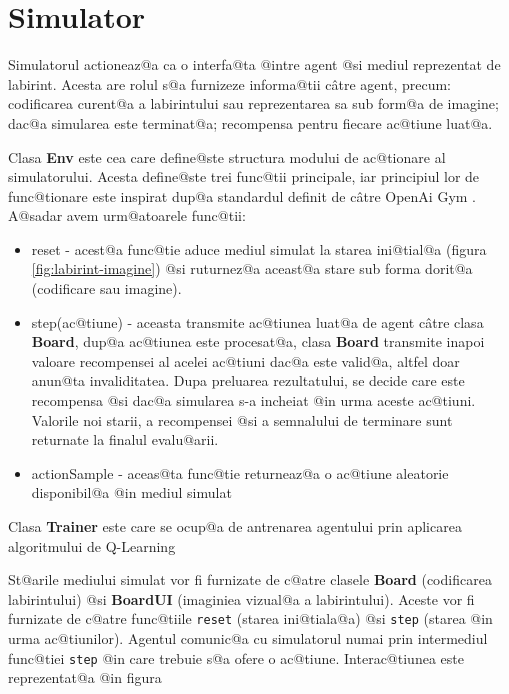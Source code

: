 \section{Simulator}


Simulatorul actioneaz@a ca o interfa@ta @intre agent @si mediul reprezentat de labirint. Acesta are rolul s@a furnizeze informa@tii c\^ atre agent, precum: codificarea curent@a a labirintului sau reprezentarea sa sub form@a de imagine; dac@a simularea este terminat@a; recompensa pentru fiecare ac@tiune luat@a.

Clasa \textbf{Env} este cea care define@ste structura modului de ac@tionare al simulatorului. Acesta define@ste trei func@tii principale, iar principiul lor de func@tionare este inspirat dup@a standardul definit de c\^ atre OpenAi Gym \cite{open-ai-gym-env-format}. A@sadar avem urm@atoarele func@tii:

\begin{itemize}
	\item reset - acest@a func@tie aduce mediul simulat la starea ini@tial@a (figura \ref{fig:labirint-imagine}) @si ruturnez@a aceast@a stare sub forma dorit@a (codificare sau imagine).
	\item step(ac@tiune) - aceasta transmite ac@tiunea luat@a de agent c\^ atre clasa \textbf{Board}, dup@a ac@tiunea este procesat@a, clasa \textbf{Board} transmite inapoi valoare recompensei al acelei ac@tiuni dac@a este valid@a, altfel doar anun@ta invaliditatea. Dupa preluarea rezultatului, se decide care este recompensa @si dac@a simularea s-a incheiat @in urma aceste ac@tiuni. Valorile noi starii, a recompensei @si a semnalului de terminare sunt returnate la finalul evalu@arii.
	\item actionSample - aceas@ta func@tie returneaz@a o ac@tiune aleatorie disponibil@a @in mediul simulat
\end{itemize}

Clasa \textbf{Trainer} este care se ocup@a de antrenarea agentului prin aplicarea algoritmului de Q-Learning

St@arile mediului simulat vor fi furnizate de c@atre clasele \textbf{Board} (codificarea labirintului) @si \textbf{BoardUI} (imaginiea vizual@a a labirintului). Aceste vor fi furnizate de c@atre func@tiile \texttt{reset} (starea ini@tiala@a) @si \texttt{step} (starea @in urma ac@tiunilor). Agentul comunic@a cu simulatorul numai prin intermediul func@tiei \texttt{step} @in care trebuie s@a ofere o ac@tiune. Interac@tiunea este reprezentat@a @in figura 

